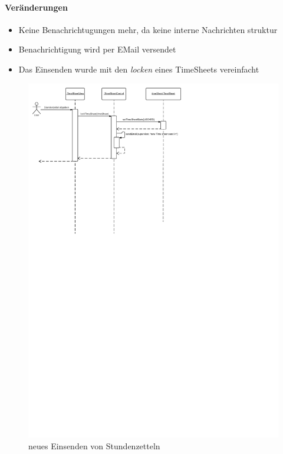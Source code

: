                     \paragraph{Veränderungen}
                    \begin{itemize}
                        \item Keine Benachrichtugungen mehr, da keine interne Nachrichten struktur
                        \item Benachrichtigung wird per EMail versendet
                        \item Das Einsenden wurde mit den \emph{locken} eines TimeSheets vereinfacht
                    \end{itemize}
                    \begin{figure}
                      \centering
                        \includegraphics[width=\linewidth]{send-in-timesheet-new.pdf}
                       \caption{neues Einsenden von Stundenzetteln}
                    \end{figure}
